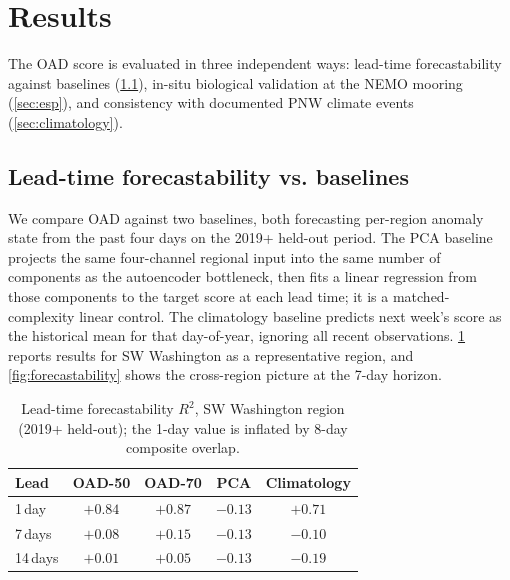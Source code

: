 \documentclass[10pt,twocolumn,letterpaper]{article}
\begin{document}
\section{Results}
\label{sec:results}

The OAD score is evaluated in three independent ways: lead-time forecastability against baselines (\cref{sec:forecastability}), in-situ biological validation at the NEMO mooring (\cref{sec:esp}), and consistency with documented PNW climate events (\cref{sec:climatology}).

\subsection{Lead-time forecastability vs. baselines}
\label{sec:forecastability}

We compare OAD against two baselines, both forecasting per-region anomaly state from the past four days on the 2019+ held-out period. The PCA baseline projects the same four-channel regional input into the same number of components as the autoencoder bottleneck, then fits a linear regression from those components to the target score at each lead time; it is a matched-complexity linear control. The climatology baseline predicts next week's score as the historical mean for that day-of-year, ignoring all recent observations. \cref{tab:leadtime} reports results for SW Washington as a representative region, and \cref{fig:forecastability} shows the cross-region picture at the 7-day horizon.

\begin{table}[ht!]
\centering\small
\caption{Lead-time forecastability $R^2$, SW Washington region (2019+ held-out); the 1-day value is inflated by 8-day composite overlap.}
\label{tab:leadtime}
\begin{tabular}{lcccc}
\toprule
\textbf{Lead} & \textbf{OAD-50} & \textbf{OAD-70} & \textbf{PCA} & \textbf{Climatology} \\
\midrule
1\,day  & $+0.84$ & $+0.87$ & $-0.13$ & $+0.71$ \\
7\,days & $+0.08$ & $+0.15$ & $-0.13$ & $-0.10$ \\
14\,days & $+0.01$ & $+0.05$ & $-0.13$ & $-0.19$ \\
\bottomrule
\end{tabular}
\end{table}
\end{document}
